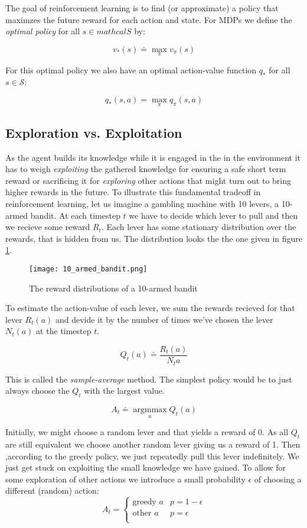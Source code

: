The goal of reinforcement learning is to find (or approximate) a policy that maximzes the future reward for each action and state. For MDPs we define the \textit{optimal policy} for all $ s \in mathcal{S} $ by:

$$ v_{*}(s) \doteq \max_{\pi} v_{\pi}(s) $$

For this optimal policy we also have an optimal action-value function $ q_{*} $ for all $ s \in \mathcal{S}$:

$$ q_{*}(s, a) = \max_{\pi}q_{\pi}(s, a) $$

\subsection{Exploration vs. Exploitation}
\label{exploration_vs_exploitation}
As the agent builds its knowledge while it is engaged in the in the environment it has to weigh \textit{exploiting} the gathered knowledge for ensuring a safe short term reward or sacrificing it for \textit{exploring} other actions that might turn out to bring higher rewards in the future. To illustrate this fundamental tradeoff in reinforcement learning, let us imagine a gambling machine with 10 levers, a 10-armed bandit. At each timestep $ t $ we have to decide which lever to pull and then we recieve some reward $ R_t $. Each lever has some stationary distribution over the rewards, that is hidden from us. The distribution looks the the one given in figure \ref{10_armed_bandit}.

\begin{figure}
    \centering
    \texttt{[image: 10\_armed\_bandit.png]}
    \caption{The reward distributions of a 10-armed bandit \cite[p.28]{sutton_reinforcement_2018}}
    \label{10_armed_bandit}
\end{figure}

To estimate the action-value of each lever, we sum the rewards recieved for that lever $ R_t(a) $ and devide it by the number of times we've chosen the lever $ N_t(a) $ at the timestep $ t $.

$$
    Q_t(a) \doteq \frac{R_t(a)}{N_t{a}}
$$

This is called the \textit{sample-average} method. The simplest policy would be to just always choose the $ Q_t $ with the largest value.

$$
    A_t \doteq \operatorname*{argmmax}_a Q_t(a)
$$

Initially, we might choose a random lever and that yields a reward of 0. As all $ Q_t $ are still equivalent we choose another random lever giving us a reward of 1. Then ,according to the greedy policy, we just repeatedly pull this lever indefinitely. We just get stuck on exploiting the small knowledge we have gained. To allow for some exploration of other actions we introduce a small probability $\epsilon $ of choosing a different (random) action:
$$
    A_t =
    \begin{cases}
        \text{greedy } a & p = 1 - \epsilon \\
        \text{other } a  & p = \epsilon     \\
    \end{cases}
$$

